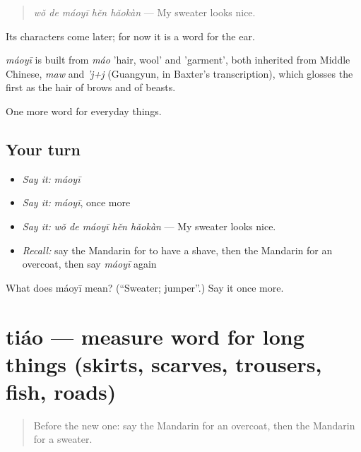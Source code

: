 \begin{quote}
\emph{wǒ de máoyī hěn hǎokàn} — My sweater looks nice.
\end{quote}

Its characters come later; for now it is a word for the ear.

\begin{cousinweb}
\emph{máoyī} is built from \emph{máo} 'hair, wool' and  'garment', both inherited from Middle Chinese, \emph{maw} and \emph{'j+j} (Guangyun, in Baxter's transcription), which glosses the first as the hair of brows and of beasts.
\end{cousinweb}

\begin{grammarlens}[title={What you've built}]
One more word for everyday things.
\end{grammarlens}

\subsection*{Your turn}
\begin{itemize}
\raggedright
  \item \emph{Say it:} \emph{máoyī}
  \item \emph{Say it:} \emph{máoyī}, once more
  \item \emph{Say it:} \emph{wǒ de máoyī hěn hǎokàn} — My sweater looks nice.
  \item \emph{Recall:} say the Mandarin for to have a shave, then the Mandarin for an overcoat, then say \emph{máoyī} again
\end{itemize}

\begin{tcolorbox}[breakable,colback=teal!4,colframe=teal!35!black,title={Before you move on}]
What does máoyī mean? (\textquotedblleft{}Sweater; jumper\textquotedblright{}.) Say it once more.
\end{tcolorbox}
\section[tiáo]{tiáo — measure word for long things (skirts, scarves, trousers, fish, roads)}

\label{lesson:ZH-C165-tiao}



\begin{quote}
Before the new one: say the Mandarin for an overcoat, then the Mandarin for a sweater.
\end{quote}

